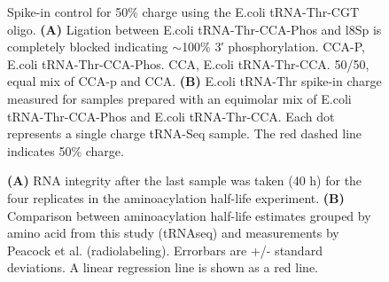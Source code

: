 \begin{figure}[ht]
    \centering
    \caption[Spike-in control for 50\% charge.]{
    Spike-in control for 50\% charge using the E.coli tRNA-Thr-CGT oligo.
    \textbf{(A)} Ligation between E.coli tRNA-Thr-CCA-Phos and l8Sp is completely blocked indicating $\sim$100\% 3′ phosphorylation.
    CCA-P, E.coli tRNA-Thr-CCA-Phos.
    CCA, E.coli tRNA-Thr-CCA.
    50/50, equal mix of CCA-p and CCA.
    \textbf{(B)} E.coli tRNA-Thr spike-in charge measured for samples prepared with an equimolar mix of E.coli tRNA-Thr-CCA-Phos and E.coli tRNA-Thr-CCA.
    Each dot represents a single charge tRNA-Seq sample.
    The red dashed line indicates 50\% charge.
    }
    \label{ch5:figsupp:f5S3}
\end{figure}


\begin{figure}[ht]
    \centering
    \caption[RNA integrity and comparison to previous half-life values.]{
    \textbf{(A)} RNA integrity after the last sample was taken (40 h) for the four replicates in the aminoacylation half-life experiment.
    \textbf{(B)} Comparison between aminoacylation half-life estimates grouped by amino acid from this study (tRNAseq) and measurements by Peacock et al. \cite{Peacock2014-wk} (radiolabeling).
    Errorbars are +/- standard deviations.
    A linear regression line is shown as a red line.
    }
    \label{ch5:figsupp:f6S1}
\end{figure}








